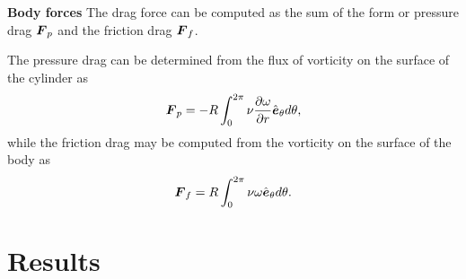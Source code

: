 {\bf Body forces}
The drag force can be computed as the sum of the form or pressure drag $\boldsymbol{F}_p$ and the friction drag $\boldsymbol{F}_f$.

The pressure drag can be determined from the flux of vorticity on the surface of the cylinder as
\begin{align}
\boldsymbol{F}_p = -R \int_0^{2\pi} \nu \frac{\partial \omega}{\partial r} \hat{\boldsymbol{e}}_{\theta} d\theta,
\end{align}
while the friction drag may be computed from the vorticity on the surface of the body as
\begin{align}
\boldsymbol{F}_f = R \int_0^{2\pi} \nu \omega \hat{\boldsymbol{e}}_{\theta} d\theta.
\end{align}


\section{Results}